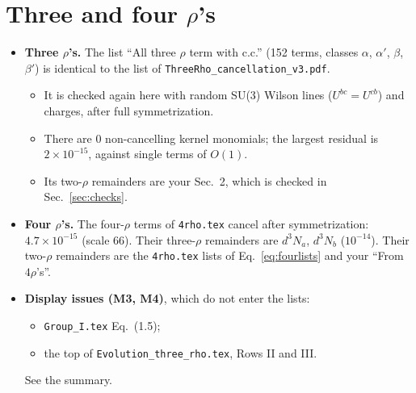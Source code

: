 \documentclass[10pt]{article}
\numberwithin{equation}{section}
\begin{document}
\section{Three and four $\rho$'s}\label{sec:three}
\begin{itemize}
\item \textbf{Three $\rho$'s.} The list ``All three $\rho$ term with c.c.'' (152 terms, classes $\alpha$, $\alpha'$, $\beta$, $\beta'$) is identical to the list of \texttt{ThreeRho\_cancellation\_v3.pdf}.
\begin{itemize}
\item It is checked again here with random SU(3) Wilson lines ($U^{bc}=U^{cb}$) and charges, after full symmetrization.
\item There are 0 non-cancelling kernel monomials; the largest residual is $2\times10^{-15}$, against single terms of $O(1)$.
\item Its two-$\rho$ remainders are your Sec.~2, which is checked in Sec.~\ref{sec:checks}.
\end{itemize}
\item \textbf{Four $\rho$'s.} The four-$\rho$ terms of \texttt{4rho.tex} cancel after symmetrization: $4.7\times10^{-15}$ (scale 66). Their three-$\rho$ remainders are $d^3N_a$, $d^3N_b$ ($10^{-14}$). Their two-$\rho$ remainders are the \texttt{4rho.tex} lists of Eq.~\eqref{eq:fourlists} and your ``From $4\rho$'s''.
\item \textbf{Display issues (M3, M4)}, which do not enter the lists:
\begin{itemize}
\item \texttt{Group\_I.tex} Eq.~(1.5);
\item the top of \texttt{Evolution\_three\_rho.tex}, Rows II and III.
\end{itemize}
See the summary.
\end{itemize}

\end{document}
